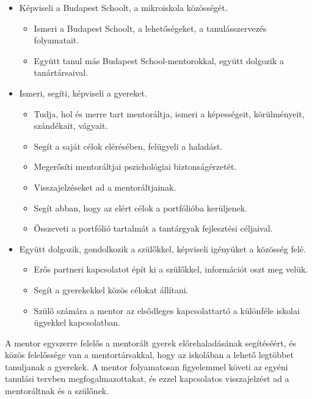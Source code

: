 \begin{itemize}
  \item Képviseli a Budapest Schoolt, a mikroiskola közösségét.
        \begin{itemize}
          \item Ismeri a Budapest Schoolt, a lehetőségeket, a tanulásszervezés
                folyamatait.
          \item Együtt tanul más Budapest School-mentorokkal, együtt dolgozik a
                tanártársaival.
        \end{itemize}

  \item Ismeri, segíti, képviseli a gyereket.
        \begin{itemize}
          \item  Tudja, hol és merre tart mentoráltja, ismeri a képességeit,
                körülményeit, szándékait, vágyait.
          \item    Segít a saját célok elérésében, felügyeli a haladást.
          \item    Megerősíti mentoráltjai pszichológiai biztonságérzetét.
          \item   Visszajelzéseket ad a mentoráltjainak.
          \item    Segít abban, hogy az elért célok a portfólióba kerüljenek.
          \item    Összeveti a portfólió tartalmát a tantárgyak fejlesztési
                céljaival.
        \end{itemize}

  \item Együtt dolgozik, gondolkozik a szülőkkel, képviseli igényüket a
        közösség felé.
        \begin{itemize}
          \item Erős partneri kapcsolatot épít ki a szülőkkel, információt oszt meg
                velük.
          \item Segít a gyerekekkel közös célokat állítani.
          \item Szülő számára a mentor az elsődleges kapcsolattartó a különféle
                iskolai ügyekkel kapcsolatban.
        \end{itemize}

\end{itemize}

A mentor egyszerre felelős a mentorált gyerek előrehaladásának segítéséért,
és
közös felelőssége van a mentortársakkal, hogy az iskolában a lehető legtöbbet
tanuljanak a gyerekek. A mentor folyamatosan figyelemmel követi az egyéni
tanulási tervben megfogalmazottakat, és ezzel kapcsolatos visszajelzést ad a
mentoráltnak és a szülőnek.

